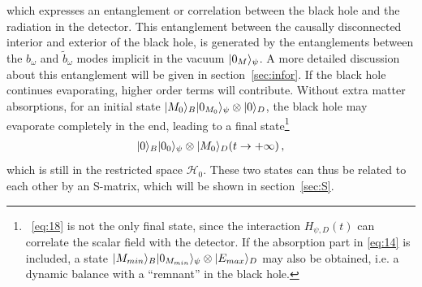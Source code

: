 \documentclass[12pt,a4paper]{article}
\begin{document}
which expresses an entanglement or correlation between the black hole and
the radiation in the detector. This entanglement between the causally disconnected interior and exterior of the black hole, is generated by the entanglements between the $b_{\omega}$ and $\tilde{b}_{\omega}$ modes implicit in the vacuum $\arrowvert0_{M}\rangle_{\psi}$. A more detailed discussion about this entanglement will be given in section~\ref{sec:infor}. If the black hole continues evaporating, higher order terms will contribute. Without extra
matter absorptions, for an initial state $\arrowvert
M_0\rangle_{B}\arrowvert0_{M_0}\rangle_{\psi}\otimes\arrowvert0\rangle_D$,
the black hole may evaporate completely in the end, leading to a
final state\footnote{~\eqref{eq:18} is not the only final state, since the
interaction $H_{\psi,D}(t)$ can correlate the scalar field with the detector. If the absorption part in
\eqref{eq:14} is included, a state $\arrowvert
M_{min}\rangle_{B}\arrowvert0_{M_{min}}\rangle_{\psi}\otimes\arrowvert
E_{max}\rangle_D$ may also be obtained, i.e. a dynamic balance with a ``remnant'' in the black hole.}
\begin{equation}
\label{eq:18}
\begin{split}
\arrowvert0\rangle_{B}\arrowvert0_{0}\rangle_{\psi}\otimes\arrowvert
M_0\rangle_{D}(t\rightarrow+\infty) \,,
\end{split}
\end{equation}
which is still in the restricted space $\mathcal {H}_0$. These two states can
thus be related to each other by an S-matrix, which will be shown in
section~\ref{sec:S}.
\end{document}
